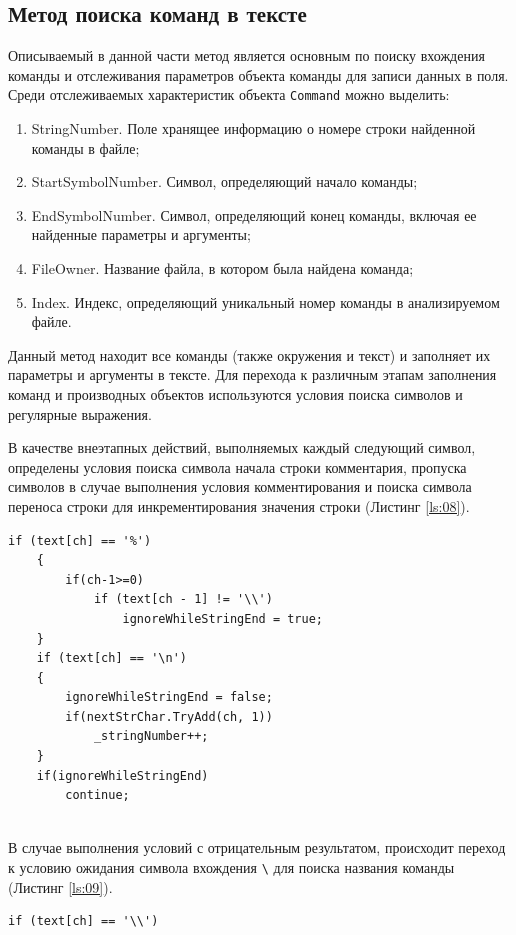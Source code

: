 \subsection{Метод поиска команд в тексте}
Описываемый в данной части метод является основным по поиску вхождения команды и отслеживания параметров объекта команды для записи данных в поля. 
Среди отслеживаемых характеристик объекта \verb|Command| можно выделить:
\begin{enumerate}
    \item StringNumber. Поле хранящее информацию о номере строки найденной команды в файле;
    \item StartSymbolNumber. Символ, определяющий начало команды;
    \item EndSymbolNumber. Символ, определяющий конец команды, включая ее найденные параметры и аргументы;
    \item FileOwner. Название файла, в котором была найдена команда;
    \item Index. Индекс, определяющий уникальный номер команды в анализируемом файле.
\end{enumerate}
Данный метод находит все команды (также окружения и текст) и заполняет их параметры и аргументы в тексте. Для перехода к различным этапам заполнения команд и производных объектов используются условия поиска символов и регулярные выражения. 

В качестве внеэтапных действий, выполняемых каждый следующий символ, определены условия поиска символа начала строки комментария, пропуска символов в случае выполнения условия комментирования и поиска символа переноса строки для инкрементирования значения строки (Листинг \ref{ls:08}). 

 
\begin{lstlisting}[caption={Условия поиска вхождения строки комментария и переноса строки}, label={ls:08}]
    if (text[ch] == '%')
    {
        if(ch-1>=0)
            if (text[ch - 1] != '\\')
                ignoreWhileStringEnd = true;
    }
    if (text[ch] == '\n')
    {
        ignoreWhileStringEnd = false;
        if(nextStrChar.TryAdd(ch, 1))
            _stringNumber++;
    }
    if(ignoreWhileStringEnd)
        continue;
        
\end{lstlisting}
     
 В случае выполнения условий с отрицательным результатом, происходит переход к условию ожидания символа вхождения \verb|\| для поиска названия команды (Листинг \ref{ls:09}).  
\begin{lstlisting}[caption={Условие начала поиска названия команды в тексте}, label={ls:09}]
      if (text[ch] == '\\')   
 \end{lstlisting}
 
